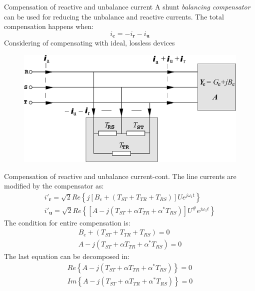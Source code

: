 \documentclass[aspectratio=169]{beamer}
\begin{document}
    \begin{frame}{Compensation of reactive and unbalance current}{\insertsection}
    A shunt \textit{balancing compensator} can be used for reducing the unbalance and reactive currents. The total compensation happens when:
    \begin{equation}
        \pmb{\mathit{i}_{c}} = -\pmb{\mathit{i}_{r}}-\pmb{\mathit{i}_{u}}
    \end{equation}
    Considering of compensating with ideal, lossless devices
    \begin{figure}
        \centering
        \includegraphics[width=0.5\columnwidth]{3P_compensator.png}
    \end{figure}
  

    \end{frame}
    \begin{frame}{Compensation of reactive and unbalance current-cont.}{\insertsection}
    The line currents are modified by the compensator as:  
    \begin{gather}
        \pmb{\mathit{i'}_{r}}=\sqrt{2}Re\left\{j\left[B_e + (T_{ST} + T_{TR} + T_{RS})\right] \pmb{\mathit{U}}e^{j\omega_1 t} \right\} \\
        \pmb{\mathit{i'}_{u}}=\sqrt{2}Re\left\{\left[A - j(T_{ST} + \alpha T_{TR} + \alpha^*T_{RS})\right] \pmb{\mathit{U^{\#}}}e^{j\omega_1 t} \right\} 
    \end{gather}
    The condition for entire compensation is:
    \begin{gather}
        B_e + (T_{ST} + T_{TR} + T_{RS}) = 0\\
        A - j(T_{ST} + \alpha T_{TR} + \alpha^*T_{RS}) = 0 \label{eq_A}
    \end{gather}
    The last equation can be decomposed in:
    \begin{gather}
        Re\left\{A - j(T_{ST} + \alpha T_{TR} + \alpha^*T_{RS})\right\}=0\\
        Im\left\{A - j(T_{ST} + \alpha T_{TR} + \alpha^*T_{RS})\right\}=0
    \end{gather}
    
    \end{frame}
\end{document}
